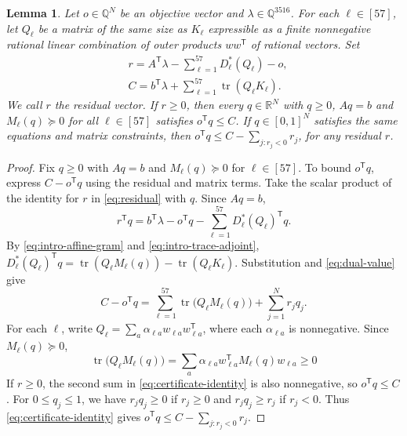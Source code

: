 \documentclass[preprint,11pt,numbers]{elsarticle-arxiv}
\numberwithin{equation}{section}
\newtheorem{lemma}[theorem]{Lemma}
\theoremstyle{definition}
\DeclareMathOperator{\tr}{tr}
\begin{document}
\begin{lemma}\label{prop:certificate-principle}
Let $o\in\mathbb Q^N$ be an objective vector and
$\lambda\in\mathbb Q^{3516}$. For each $\ell\in[57]$, let $Q_\ell$
be a matrix of the same size as $K_\ell$ expressible as a finite
nonnegative rational linear combination of outer products
$ww^{\mathsf T}$ of rational vectors. Set
\begin{align}
 &r=A^{\mathsf T}\lambda-\sum_{\ell=1}^{57}D_\ell^*(Q_\ell)-o,
 \label{eq:residual}\\
 &C=b^{\mathsf T}\lambda+\sum_{\ell=1}^{57}\tr(Q_\ell K_\ell).
 \label{eq:dual-value}
\end{align}
We call $r$ the residual vector. If $r\geq0$, then every $q\in\mathbb R^N$ with $q\geq0$, $Aq=b$ and
$M_\ell(q)\succeq0$ for all $\ell\in[57]$ satisfies $o^{\mathsf T}q\leq C$.
If $q\in[0,1]^N$ satisfies the same equations and matrix constraints,
then $o^{\mathsf T}q\leq C-\sum_{j:r_j<0}r_j$, for any residual $r$.
\end{lemma}

\begin{proof}
Fix $q\geq0$ with $Aq=b$ and $M_\ell(q)\succeq0$ for
$\ell\in[57]$. To bound $o^{\mathsf T}q$, express $C-o^{\mathsf T}q$
using the residual and matrix terms. Take the scalar product of
the identity for $r$ in \eqref{eq:residual} with $q$. Since $Aq=b$,
\[
 r^{\mathsf T}q=b^{\mathsf T}\lambda-o^{\mathsf T}q
       -\sum_{\ell=1}^{57}D_\ell^*(Q_\ell)^{\mathsf T}q.
\]
By \eqref{eq:intro-affine-gram} and \eqref{eq:intro-trace-adjoint},
$D_\ell^*(Q_\ell)^{\mathsf T}q
=\tr(Q_\ell M_\ell(q))-\tr(Q_\ell K_\ell)$.
Substitution and \eqref{eq:dual-value} give
\begin{equation}\label{eq:certificate-identity}
 C-o^{\mathsf T}q
 =\sum_{\ell=1}^{57}\tr\bigl(Q_\ell M_\ell(q)\bigr)
  +\sum_{j=1}^N r_jq_j.
\end{equation}
For each $\ell$, write
$Q_\ell=\sum_a\alpha_{\ell a}w_{\ell a}w_{\ell a}^{\mathsf T}$,
where each $\alpha_{\ell a}$ is nonnegative. Since
$M_\ell(q)\succeq0$,
\[
 \tr\bigl(Q_\ell M_\ell(q)\bigr)=
 \sum_a\alpha_{\ell a}w_{\ell a}^{\mathsf T}M_\ell(q)w_{\ell a}\geq0
\]
If $r\geq0$, the second sum in \eqref{eq:certificate-identity}
is also nonnegative, so $o^{\mathsf T}q\leq C$.
For $0\leq q_j\leq1$, we have $r_jq_j\geq0$ if $r_j\geq0$ and
$r_jq_j\geq r_j$ if $r_j<0$. Thus \eqref{eq:certificate-identity}
gives $o^{\mathsf T}q\leq C-\sum_{j:r_j<0}r_j$.
\end{proof}
\relax\space%
\end{document}
